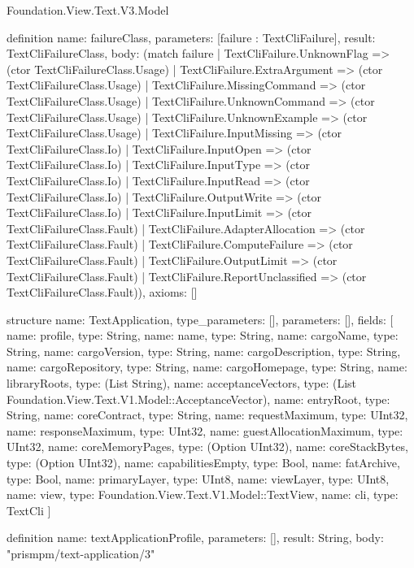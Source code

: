 \begin{lexlean}{Foundation.View.Text.V3.Model}
\begin{semanticmodule}
definition{
  name: failureClass,
  parameters: [failure : TextCliFailure],
  result: TextCliFailureClass,
  body: (match failure
    | TextCliFailure.UnknownFlag => (ctor TextCliFailureClass.Usage)
    | TextCliFailure.ExtraArgument => (ctor TextCliFailureClass.Usage)
    | TextCliFailure.MissingCommand => (ctor TextCliFailureClass.Usage)
    | TextCliFailure.UnknownCommand => (ctor TextCliFailureClass.Usage)
    | TextCliFailure.UnknownExample => (ctor TextCliFailureClass.Usage)
    | TextCliFailure.InputMissing => (ctor TextCliFailureClass.Io)
    | TextCliFailure.InputOpen => (ctor TextCliFailureClass.Io)
    | TextCliFailure.InputType => (ctor TextCliFailureClass.Io)
    | TextCliFailure.InputRead => (ctor TextCliFailureClass.Io)
    | TextCliFailure.OutputWrite => (ctor TextCliFailureClass.Io)
    | TextCliFailure.InputLimit => (ctor TextCliFailureClass.Fault)
    | TextCliFailure.AdapterAllocation => (ctor TextCliFailureClass.Fault)
    | TextCliFailure.ComputeFailure => (ctor TextCliFailureClass.Fault)
    | TextCliFailure.OutputLimit => (ctor TextCliFailureClass.Fault)
    | TextCliFailure.ReportUnclassified => (ctor TextCliFailureClass.Fault)),
  axioms: []
}

structure{
  name: TextApplication,
  type_parameters: [],
  parameters: [],
  fields: [
    {name: profile, type: String},
    {name: name, type: String},
    {name: cargoName, type: String},
    {name: cargoVersion, type: String},
    {name: cargoDescription, type: String},
    {name: cargoRepository, type: String},
    {name: cargoHomepage, type: String},
    {name: libraryRoots, type: (List String)},
    {name: acceptanceVectors, type: (List Foundation.View.Text.V1.Model::AcceptanceVector)},
    {name: entryRoot, type: String},
    {name: coreContract, type: String},
    {name: requestMaximum, type: UInt32},
    {name: responseMaximum, type: UInt32},
    {name: guestAllocationMaximum, type: UInt32},
    {name: coreMemoryPages, type: (Option UInt32)},
    {name: coreStackBytes, type: (Option UInt32)},
    {name: capabilitiesEmpty, type: Bool},
    {name: fatArchive, type: Bool},
    {name: primaryLayer, type: UInt8},
    {name: viewLayer, type: UInt8},
    {name: view, type: Foundation.View.Text.V1.Model::TextView},
    {name: cli, type: TextCli}
  ]
}

definition{
  name: textApplicationProfile,
  parameters: [],
  result: String,
  body: "prismpm/text-application/3"
}
\end{semanticmodule}
\end{lexlean}
